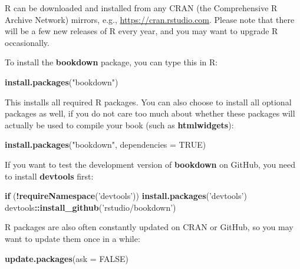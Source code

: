\documentclass[12pt,]{krantz}
\makeatletter
\newenvironment{Shaded}{\begin{snugshade}}{\end{snugshade}}
\newcommand{\KeywordTok}[1]{\textcolor[rgb]{0.13,0.29,0.53}{\textbf{#1}}}
\newcommand{\DataTypeTok}[1]{\textcolor[rgb]{0.13,0.29,0.53}{#1}}
\newcommand{\StringTok}[1]{\textcolor[rgb]{0.31,0.60,0.02}{#1}}
\newcommand{\OtherTok}[1]{\textcolor[rgb]{0.56,0.35,0.01}{#1}}
\newcommand{\ControlFlowTok}[1]{\textcolor[rgb]{0.13,0.29,0.53}{\textbf{#1}}}
\newcommand{\OperatorTok}[1]{\textcolor[rgb]{0.81,0.36,0.00}{\textbf{#1}}}
\newcommand{\NormalTok}[1]{#1}
\newenvironment{kframe}{%
\medskip{}
\setlength{\fboxsep}{.8em}
 \def\at@end@of@kframe{}%
 \ifinner\ifhmode%
  \def\at@end@of@kframe{\end{minipage}}%
  \begin{minipage}{\columnwidth}%
 \fi\fi%
 \def\FrameCommand##1{\hskip\@totalleftmargin \hskip-\fboxsep
 \colorbox{shadecolor}{##1}\hskip-\fboxsep
     \hskip-\linewidth \hskip-\@totalleftmargin \hskip\columnwidth}%
 \MakeFramed {\advance\hsize-\width
   \@totalleftmargin\z@ \linewidth\hsize
   \@setminipage}}%
 {\par\unskip\endMakeFramed%
 \at@end@of@kframe}
\renewenvironment{Shaded}{\begin{kframe}}{\end{kframe}}
\theoremstyle{definition}
\theoremstyle{definition}
\theoremstyle{definition}
\theoremstyle{remark}
\makeatother
\begin{document}
R can be downloaded and installed from any CRAN (the Comprehensive R
Archive Network) mirrors, e.g., \url{https://cran.rstudio.com}. Please
note that there will be a few new releases of R every year, and you may
want to upgrade R occasionally.

To install the \textbf{bookdown} package, you can type this in R:

\begin{Shaded}
\begin{Highlighting}[]
\KeywordTok{install.packages}\NormalTok{(}\StringTok{"bookdown"}\NormalTok{)}
\end{Highlighting}
\end{Shaded}

This installs all required R packages. You can also choose to install
all optional packages as well, if you do not care too much about whether
these packages will actually be used to compile your book (such as
\textbf{htmlwidgets}):

\begin{Shaded}
\begin{Highlighting}[]
\KeywordTok{install.packages}\NormalTok{(}\StringTok{"bookdown"}\NormalTok{, }\DataTypeTok{dependencies =} \OtherTok{TRUE}\NormalTok{)}
\end{Highlighting}
\end{Shaded}

If you want to test the development version of \textbf{bookdown} on
GitHub, you need to install \textbf{devtools} first:

\begin{Shaded}
\begin{Highlighting}[]
\ControlFlowTok{if}\NormalTok{ (}\OperatorTok{!}\KeywordTok{requireNamespace}\NormalTok{(}\StringTok{'devtools'}\NormalTok{)) }\KeywordTok{install.packages}\NormalTok{(}\StringTok{'devtools'}\NormalTok{)}
\NormalTok{devtools}\OperatorTok{::}\KeywordTok{install_github}\NormalTok{(}\StringTok{'rstudio/bookdown'}\NormalTok{)}
\end{Highlighting}
\end{Shaded}

R packages are also often constantly updated on CRAN or GitHub, so you
may want to update them once in a while:

\begin{Shaded}
\begin{Highlighting}[]
\KeywordTok{update.packages}\NormalTok{(}\DataTypeTok{ask =} \OtherTok{FALSE}\NormalTok{)}
\end{Highlighting}
\end{Shaded}
\end{document}
